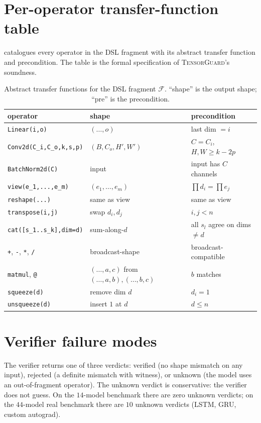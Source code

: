 \documentclass{article}
\theoremstyle{definition}
\begin{document}
\section{Per-operator transfer-function table}\label{sec:transfer-fns}
 catalogues every operator in the DSL fragment
with its abstract transfer function and precondition. The table
is the formal specification of \textsc{TensorGuard}'s soundness.

\begin{table}[t]
\centering\scriptsize
\caption{Abstract transfer functions for the DSL fragment
$\mathcal F$. ``shape'' is the output shape; ``pre'' is the
precondition.}
\label{tab:transfer}
\begin{tabular}{lll}
\toprule
operator & shape & precondition \\
\midrule
\verb|Linear(i,o)|     & $(\ldots, o)$ & last dim $=i$ \\
\verb|Conv2d(C_i,C_o,k,s,p)| & $(B,C_o,H',W')$ & $C=C_i$, $H,W \ge k-2p$ \\
\verb|BatchNorm2d(C)|  & input          & input has $C$ channels \\
\verb|view(e_1,...,e_m)| & $(e_1,\ldots,e_m)$ & $\prod d_i = \prod e_j$ \\
\verb|reshape(...)|    & same as view  & same as view \\
\verb|transpose(i,j)|  & swap $d_i,d_j$ & $i,j < n$ \\
\verb|cat([s_1..s_k],dim=d)| & sum-along-$d$ & all $s_l$ agree on dims $\ne d$ \\
\verb|+|, \verb|-|, \verb|*|, \verb|/| & broadcast-shape & broadcast-compatible \\
\verb|matmul|, \verb|@| & $(\ldots,a,c)$ from $(\ldots,a,b),(\ldots,b,c)$ & $b$ matches \\
\verb|squeeze(d)|      & remove dim $d$ & $d_i = 1$ \\
\verb|unsqueeze(d)|    & insert $1$ at $d$ & $d \le n$ \\
\bottomrule
\end{tabular}
\end{table}

\section{Verifier failure modes}\label{sec:failure-modes}
The verifier returns one of three verdicts:
\textsf{verified} (no shape mismatch on any input),
\textsf{rejected} (a definite mismatch with witness), or
\textsf{unknown} (the model uses an out-of-fragment operator).
The \textsf{unknown} verdict is conservative: the verifier does
not guess. On the $14$-model benchmark there are zero
\textsf{unknown} verdicts; on the $44$-model real benchmark there
are $10$ \textsf{unknown} verdicts (LSTM, GRU, custom autograd).
\end{document}

